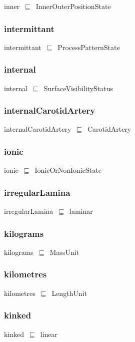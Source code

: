 \documentclass{article}
\begin{document}
inner~\ensuremath{\sqsubseteq}~InnerOuterPositionState~

\subsubsection*{intermittant}

intermittant~\ensuremath{\sqsubseteq}~ProcessPatternState~

\subsubsection*{internal}

internal~\ensuremath{\sqsubseteq}~SurfaceVisibilityStatus~

\subsubsection*{internalCarotidArtery}

internalCarotidArtery~\ensuremath{\sqsubseteq}~CarotidArtery~

\subsubsection*{ionic}

ionic~\ensuremath{\sqsubseteq}~IonicOrNonIonicState~

\subsubsection*{irregularLamina}

irregularLamina~\ensuremath{\sqsubseteq}~laminar~

\subsubsection*{kilograms}

kilograms~\ensuremath{\sqsubseteq}~MassUnit~

\subsubsection*{kilometres}

kilometres~\ensuremath{\sqsubseteq}~LengthUnit~

\subsubsection*{kinked}

kinked~\ensuremath{\sqsubseteq}~linear~
\end{document}
